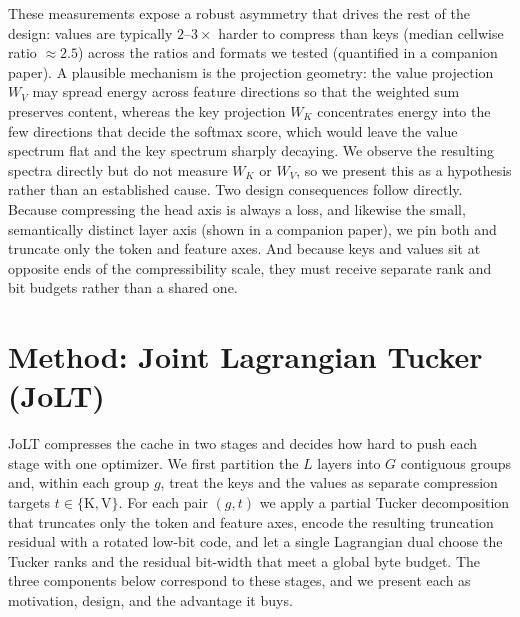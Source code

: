 \documentclass{article}
\begin{document}
These measurements expose a robust asymmetry that drives the rest of the design: values are typically $2$--$3\times$ harder to compress than keys (median cellwise ratio $\approx 2.5$) across the ratios and formats we tested (quantified in a companion paper). A plausible mechanism is the projection geometry: the value projection $W_V$ may spread energy across feature directions so that the weighted sum preserves content, whereas the key projection $W_K$ concentrates energy into the few directions that decide the softmax score, which would leave the value spectrum flat and the key spectrum sharply decaying. We observe the resulting spectra directly but do not measure $W_K$ or $W_V$, so we present this as a hypothesis rather than an established cause. Two design consequences follow directly. Because compressing the head axis is always a loss, and likewise the small, semantically distinct layer axis (shown in a companion paper), we pin both and truncate only the token and feature axes. And because keys and values sit at opposite ends of the compressibility scale, they must receive separate rank and bit budgets rather than a shared one.

\section{Method: Joint Lagrangian Tucker (JoLT)}
\label{sec:method}
JoLT compresses the cache in two stages and decides how hard to push each stage with one optimizer. We first partition the $L$ layers into $G$ contiguous groups and, within each group $g$, treat the keys and the values as separate compression targets $t \in \{\mathrm{K}, \mathrm{V}\}$. For each pair $(g, t)$ we apply a partial Tucker decomposition that truncates only the token and feature axes, encode the resulting truncation residual with a rotated low-bit code, and let a single Lagrangian dual choose the Tucker ranks and the residual bit-width that meet a global byte budget. The three components below correspond to these stages, and we present each as motivation, design, and the advantage it buys.
\end{document}
